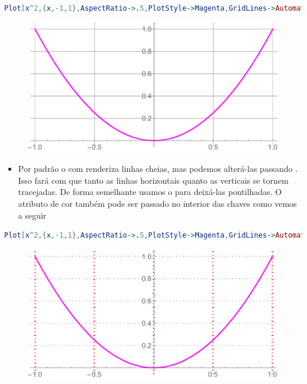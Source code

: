 \documentclass[a4paper, 12pt]{article}
\begin{document}
\begin{itemize}
\begin{lstlisting}[language=Mathematica]
Plot[x^2,{x,-1,1},AspectRatio->.5,PlotStyle->Magenta,GridLines->Automatic]
\end{lstlisting}
\begin{figure}[!h]
	\centering
	\includegraphics[scale=.55]{images/grid}
\end{figure}
		
		\begin{itemize}
			\item[] Por padrão o  com  renderiza linhas cheias, mas podemos alterá-las passando . Isso fará com que tanto as linhas horizontais quanto as verticais se tornem tracejadas. De forma semelhante usamos o  para deixá-las pontilhadas. O atributo de cor também pode ser passado no interior das chaves como vemos a seguir
		\end{itemize}

\begin{lstlisting}[language=Mathematica]
Plot[x^2,{x,-1,1},AspectRatio->.5,PlotStyle->Magenta,GridLines->Automatic,GridLinesStyle->{{Red, Dotted, Thick},{Gray, Dotted}}}]
\end{lstlisting}
\begin{figure}[!h]
	\centering
	\includegraphics[scale=.85]{images/gridStyle}
\end{figure}


\end{itemize}
\end{document}
